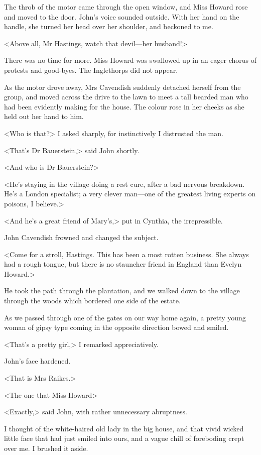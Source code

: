  The throb of the motor came through the open window, and Miss Howard rose and moved to the door. John's voice sounded outside. With her hand on the handle, she turned her head over her shoulder, and beckoned to me. 

 <Above all, Mr Hastings, watch that devil—her husband!> 

 There was no time for more. Miss Howard was swallowed up in an eager chorus of protests and good-byes. The Inglethorps did not appear. 

 As the motor drove away, Mrs Cavendish suddenly detached herself from the group, and moved across the drive to the lawn to meet a tall bearded man who had been evidently making for the house. The colour rose in her cheeks as she held out her hand to him. 

 <Who is that?> I asked sharply, for instinctively I distrusted the man. 

 <That's Dr Bauerstein,> said John shortly. 

 <And who is Dr Bauerstein?> 

 <He's staying in the village doing a rest cure, after a bad nervous breakdown. He's a London specialist; a very clever man—one of the greatest living experts on poisons, I believe.> 

 <And he's a great friend of Mary's,> put in Cynthia, the irrepressible. 

 John Cavendish frowned and changed the subject. 

 <Come for a stroll, Hastings. This has been a most rotten business. She always had a rough tongue, but there is no stauncher friend in England than Evelyn Howard.> 

 He took the path through the plantation, and we walked down to the village through the woods which bordered one side of the estate. 

 As we passed through one of the gates on our way home again, a pretty young woman of gipsy type coming in the opposite direction bowed and smiled. 

 <That's a pretty girl,> I remarked appreciatively. 

 John's face hardened. 

 <That is Mrs Raikes.> 

 <The one that Miss Howard\longdash> 

 <Exactly,> said John, with rather unnecessary abruptness. 

 I thought of the white-haired old lady in the big house, and that vivid wicked little face that had just smiled into ours, and a vague chill of foreboding crept over me. I brushed it aside. 

